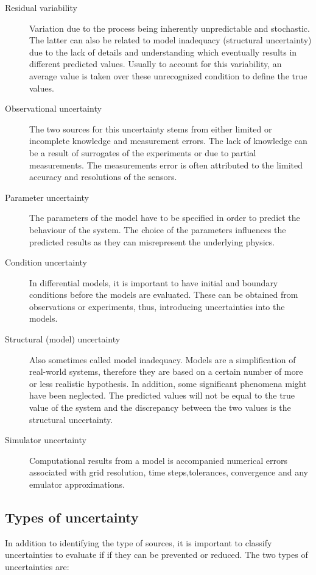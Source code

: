 \begin{description}
\item[Residual variability] Variation due to the process being inherently unpredictable and stochastic. The latter can also be related to model inadequacy (structural uncertainty) due to the lack of details and understanding which eventually results in different predicted values. Usually to account for this variability, an average value is taken over these unrecognized condition to define the true values.

\item[Observational uncertainty] The two sources for this uncertainty stems from either limited or incomplete knowledge and measurement errors. The lack of knowledge can be a result of surrogates of the experiments or due to partial measurements. The measurements error is often attributed to the limited accuracy and resolutions of the sensors.

\item[Parameter uncertainty] The parameters of the model have to be specified in order to predict the behaviour of the system. The choice of the parameters influences the predicted results as they can misrepresent the underlying physics.

\item[Condition uncertainty] In differential models, it is important to have initial and boundary conditions before the models are evaluated. These can be obtained from observations or experiments, thus, introducing uncertainties into the models.

\item[Structural (model) uncertainty] Also sometimes called model inadequacy. Models are a simplification of real-world systems, therefore they are based on a certain number of more or less realistic hypothesis. In addition, some significant phenomena might have been neglected. The predicted values will not be equal to the true value of the system and the discrepancy between the two values is the structural uncertainty. 

\item[Simulator uncertainty] Computational results from a model is accompanied numerical errors associated with grid resolution, time steps,tolerances, convergence and any emulator approximations.
\end{description}

\subsection{Types of uncertainty}
In addition to identifying the type of sources, it is important to classify uncertainties to evaluate if if they can be prevented or reduced. The two types of uncertainties are:

